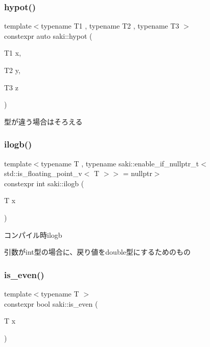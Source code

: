 \subsubsection{\texorpdfstring{hypot()}{hypot()}\hspace{0.1cm}{\footnotesize\ttfamily [6/6]}}
{\footnotesize\ttfamily template$<$typename T1 , typename T2 , typename T3 $>$ \\
constexpr auto saki\+::hypot (\begin{DoxyParamCaption}\item[{T1}]{x,  }\item[{T2}]{y,  }\item[{T3}]{z }\end{DoxyParamCaption})}



型が違う場合はそろえる 

\mbox{\label{namespacesaki_a582e9de82aa8572287c01530ae2626a8}} 
\subsubsection{\texorpdfstring{ilogb()}{ilogb()}}
{\footnotesize\ttfamily template$<$typename T , typename saki\+::enable\+\_\+if\+\_\+nullptr\+\_\+t$<$ std\+::is\+\_\+floating\+\_\+point\+\_\+v$<$ T $>$$>$  = nullptr$>$ \\
constexpr int saki\+::ilogb (\begin{DoxyParamCaption}\item[{T}]{x }\end{DoxyParamCaption})}



コンパイル時ilogb 

引数がint型の場合に、戻り値をdouble型にするためのもの \mbox{\label{namespacesaki_a7fa7e4ec89e948874e42926e91d6dd4e}} 
\subsubsection{\texorpdfstring{is\+\_\+even()}{is\_even()}}
{\footnotesize\ttfamily template$<$typename T $>$ \\
constexpr bool saki\+::is\+\_\+even (\begin{DoxyParamCaption}\item[{T}]{x }\end{DoxyParamCaption})}



